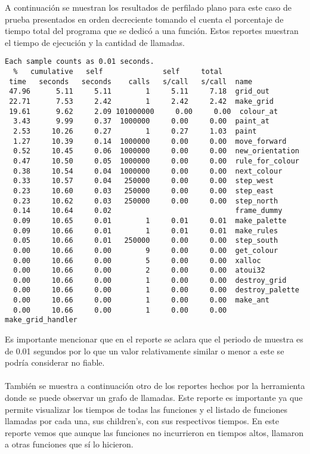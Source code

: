 \documentclass[a4paper, 10pt, twoside, notitlepage]{article}
\begin{document}
A continuación se muestran los resultados de perfilado plano para este caso de prueba presentados en orden decreciente tomando el cuenta el porcentaje de tiempo total del programa que se dedicó a una función. Estos reportes muestran el tiempo de ejecución y la cantidad de llamadas. 
\scriptsize
\begin{verbatim}
Each sample counts as 0.01 seconds.
  %   cumulative   self              self     total           
 time   seconds   seconds    calls   s/call   s/call  name    
 47.96      5.11     5.11        1     5.11     7.18  grid_out
 22.71      7.53     2.42        1     2.42     2.42  make_grid
 19.61      9.62     2.09 101000000     0.00     0.00  colour_at
  3.43      9.99     0.37  1000000     0.00     0.00  paint_at
  2.53     10.26     0.27        1     0.27     1.03  paint
  1.27     10.39     0.14  1000000     0.00     0.00  move_forward
  0.52     10.45     0.06  1000000     0.00     0.00  new_orientation
  0.47     10.50     0.05  1000000     0.00     0.00  rule_for_colour
  0.38     10.54     0.04  1000000     0.00     0.00  next_colour
  0.33     10.57     0.04   250000     0.00     0.00  step_west
  0.23     10.60     0.03   250000     0.00     0.00  step_east
  0.23     10.62     0.03   250000     0.00     0.00  step_north
  0.14     10.64     0.02                             frame_dummy
  0.09     10.65     0.01        1     0.01     0.01  make_palette
  0.09     10.66     0.01        1     0.01     0.01  make_rules
  0.05     10.66     0.01   250000     0.00     0.00  step_south
  0.00     10.66     0.00        9     0.00     0.00  get_colour
  0.00     10.66     0.00        5     0.00     0.00  xalloc
  0.00     10.66     0.00        2     0.00     0.00  atoui32
  0.00     10.66     0.00        1     0.00     0.00  destroy_grid
  0.00     10.66     0.00        1     0.00     0.00  destroy_palette
  0.00     10.66     0.00        1     0.00     0.00  make_ant
  0.00     10.66     0.00        1     0.00     0.00  make_grid_handler

\end{verbatim}
\normalsize
Es importante mencionar que en el reporte se aclara que el periodo de muestra es de 0.01 segundos por lo que un valor relativamente similar o menor a este se podría considerar no fiable.\\
\\
También se muestra a continuación otro de los reportes hechos por la herramienta donde se puede observar un grafo de llamadas. Este reporte es importante ya que permite visualizar los tiempos de todas las funciones y el listado de funciones llamadas por cada una, sus children's, con sus respectivos tiempos. En este reporte vemos que aunque las funciones no incurrieron en tiempos altos, llamaron a otras funciones que sí lo hicieron.
\end{document}
